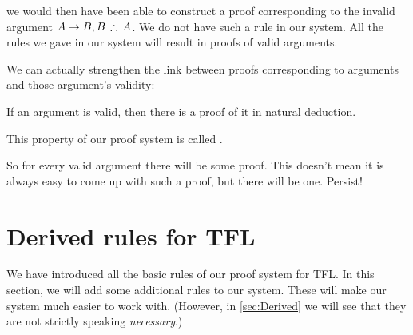 	we would then have been able to construct a proof corresponding to the invalid argument $A\eif B, B\,\therefore\, A$.
We do not have such a rule in our system. All the rules we gave in our system will result in proofs of valid arguments.


We can actually strengthen the link between proofs corresponding to arguments and those argument's validity:
\begin{highlighted}
If an argument is valid, then there is a proof of it in natural deduction.
\end{highlighted}
This property of our proof system is called .

So for every valid argument there will be some proof. This doesn't mean it is always easy to come up with such a proof, but there will be one. Persist!







\chapter{Derived rules for TFL}\label{sec:Further}
We have introduced all the basic rules of our proof system for TFL. In this section, we will add some additional rules to our system. These will make our system much easier to work with. (However, in \cref{sec:Derived} we will see that they are not strictly speaking \emph{necessary}.)

%

